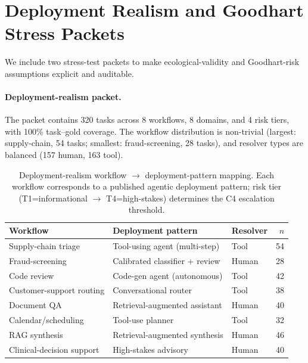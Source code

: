 \documentclass[10pt]{article}
\begin{document}
\section{Deployment Realism and Goodhart Stress Packets}
\label{app:deployment-realism}

We include two stress-test packets to make ecological-validity and Goodhart-risk
assumptions explicit and auditable.

\paragraph{Deployment-realism packet.}
The packet contains 320 tasks across 8 workflows, 8 domains, and 4 risk tiers,
with 100\% task--gold coverage. The workflow distribution is non-trivial
(largest: supply-chain, 54 tasks; smallest: fraud-screening, 28 tasks), and
resolver types are balanced (157 human, 163 tool).

\begin{table}[H]
\centering
\caption{Deployment-realism workflow $\to$ deployment-pattern mapping. Each workflow corresponds to a published agentic deployment pattern; risk tier (T1=informational $\to$ T4=high-stakes) determines the C4 escalation threshold.}
\label{tab:deployment-mapping}
\small
\begin{tabular}{lll r}
\toprule
Workflow & Deployment pattern & Resolver & $n$ \\
\midrule
Supply-chain triage          & Tool-using agent (multi-step) & Tool   & 54 \\
Fraud-screening              & Calibrated classifier + review & Human & 28 \\
Code review                  & Code-gen agent (autonomous)   & Tool   & 42 \\
Customer-support routing     & Conversational router         & Tool   & 38 \\
Document QA                  & Retrieval-augmented assistant & Human  & 40 \\
Calendar/scheduling          & Tool-use planner              & Tool   & 32 \\
RAG synthesis                & Retrieval-augmented synthesis & Human  & 46 \\
Clinical-decision support    & High-stakes advisory          & Human  & 40 \\
\bottomrule
\end{tabular}
\end{table}
\end{document}
